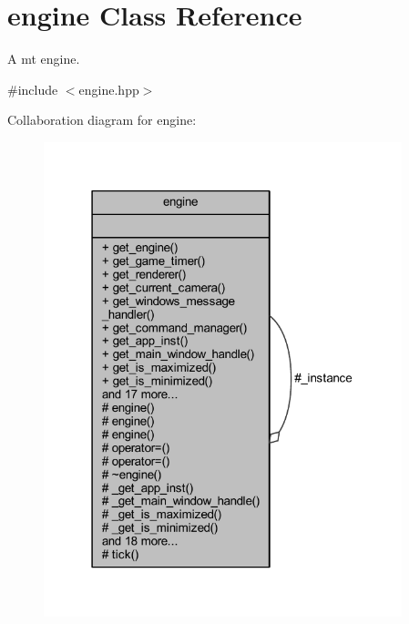 \hypertarget{classengine}{}\section{engine Class Reference}
\label{classengine}


A mt engine.  




{\ttfamily \#include $<$engine.\+hpp$>$}



Collaboration diagram for engine\+:\nopagebreak
\begin{figure}[H]
\begin{center}
\leavevmode
\includegraphics[width=295pt]{classengine__coll__graph}
\end{center}
\end{figure}
